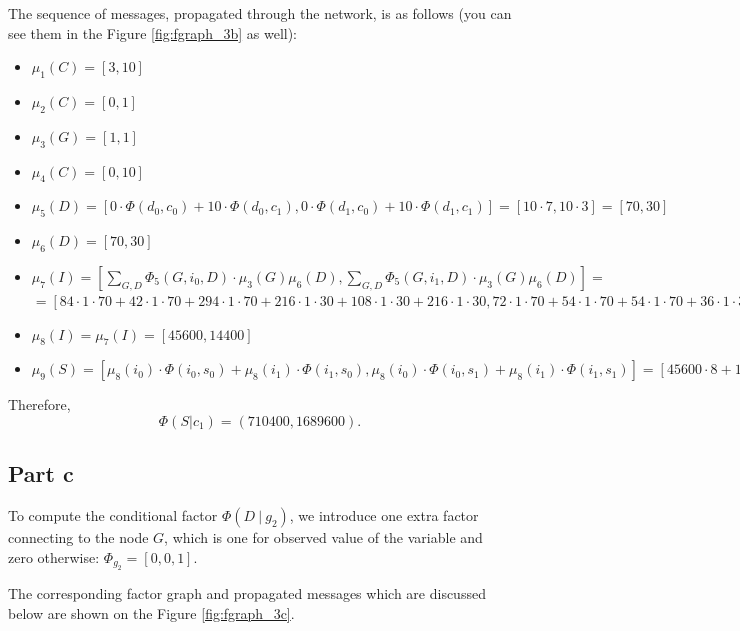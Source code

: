 \documentclass[11pt,a4paper]{article}
\begin{document}
	The sequence of messages, propagated through the network, is as follows (you can see them in the Figure \ref{fig:fgraph_3b} as well):
	\begin{itemize}
		\item $ \mu_1(C) = [3, 10] $
		\item $ \mu_2(C) = [0, 1] $
		\item $ \mu_3(G) = [1, 1] $
		\item $ \mu_4(C) = [0, 10] $
		\item $ \mu_5(D) = [0 \cdot \Phi(d_0, c_0) + 10 \cdot \Phi(d_0, c_1), 0 \cdot \Phi(d_1, c_0) + 10 \cdot \Phi(d_1, c_1)] = [10 \cdot 7, 10 \cdot 3] = [70, 30] $
		\item $ \mu_6(D) = [70, 30]$
		\item $ \mu_7(I) = \left[\sum_{G, D}\Phi_5 (G, i_0, D) \cdot \mu_3(G) \mu_6(D), \sum_{G, D}\Phi_5 (G, i_1, D) \cdot \mu_3(G) \mu_6(D) \right] = $ \\
		$ = [84 \cdot 1 \cdot 70 + 42 \cdot 1 \cdot 70+ 294 \cdot 1 \cdot 70 + 216 \cdot 1 \cdot 30 + 108 \cdot 1 \cdot 30 + 216 \cdot 1 \cdot 30, 72 \cdot 1 \cdot 70 + 54 \cdot 1 \cdot 70+ 54 \cdot 1 \cdot 70 + 36 \cdot 1 \cdot 30 + 18 \cdot 1 \cdot 30 + 6 \cdot 1 \cdot 30] = [45600, 14400] $
		\item $ \mu_8(I) = \mu_7(I)  = [45600, 14400]$
		\item $ \mu_9(S) = [\mu_8(i_0) \cdot \Phi(i_0, s_0) + \mu_8(i_1) \cdot \Phi(i_1, s_0), \mu_8(i_0) \cdot \Phi(i_0, s_1) + \mu_8(i_1) \cdot \Phi(i_1, s_1)] = [45600 \cdot 8 + 14400 \cdot 24, 45600 \cdot 32 + 14400 \cdot 16] = [710400, 1689600]$
	\end{itemize}
	
	Therefore, $$ \Phi(S | c_1) = (710400, 1689600). $$
	
	
\subsection*{Part c}
	To compute the conditional factor $\Phi(D \ | \ g_2)$, we introduce one extra factor connecting to the node $G$, which is one for observed value of the variable and zero otherwise: $\Phi_{g_2} = [0, 0, 1]. $
	
	
	The corresponding factor graph and propagated messages which are discussed below are shown on the Figure \ref{fig:fgraph_3c}.
	
\end{document}
